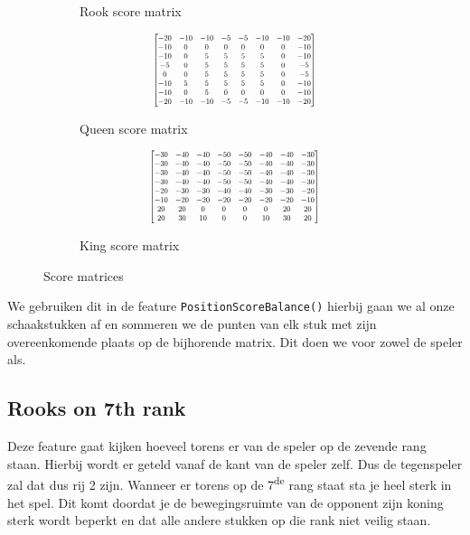 \documentclass[a4paper,openany]{uantwerpenassignment}
\newcommand{\codeword}[1]{
    \colorbox{code}{\texttt{\textcolor{codetext}{#1}}}
}
\newcommand{\ts}{\textsuperscript}
\newcommand\scalemath[2]{\scalebox{#1}{\mbox{\ensuremath{\displaystyle #2}}}}
\begin{document}
\begin{figure}[h]
\begin{subfigure}{.3\textwidth}
$$		$$
		\caption{Rook score matrix}
    \end{subfigure}
    \begin{subfigure}{.3\textwidth}
    	$$
    	\scalemath{0.6}{
    	\begin{bmatrix}
		-20& -10& -10& -5& -5& -10& -10& -20\\
		-10& 0& 0& 0& 0& 0& 0& -10\\
		-10& 0& 5& 5& 5& 5& 0& -10\\
		-5& 0& 5& 5& 5& 5& 0& -5\\
		0& 0& 5& 5& 5& 5& 0& -5\\
		-10& 5& 5& 5& 5& 5& 0& -10\\
		-10& 0& 5& 0& 0& 0& 0& -10\\
		-20& -10& -10& -5& -5& -10& -10& -20
		\end{bmatrix}}
		$$
		\caption{Queen score matrix}
    \end{subfigure}
    \begin{subfigure}{.3\textwidth}
    	$$
    	\scalemath{0.6}{
    	\begin{bmatrix}
		-30& -40& -40& -50& -50& -40& -40& -30\\
		-30& -40& -40& -50& -50& -40& -40& -30\\
		-30& -40& -40& -50& -50& -40& -40& -30\\
		-30& -40& -40& -50& -50& -40& -40& -30\\
		-20& -30& -30& -40& -40& -30& -30& -20\\
		-10& -20& -20& -20& -20& -20& -20& -10\\
		20& 20& 0& 0& 0& 0& 20& 20\\
		20& 30& 10& 0& 0& 10& 30& 20
		\end{bmatrix}}
		$$
		\caption{King score matrix}
    \end{subfigure}
    \caption{Score matrices}
\end{figure}

We gebruiken dit in de feature \codeword{PositionScoreBalance()} hierbij gaan we al onze schaakstukken af en sommeren we de punten van elk stuk met zijn overeenkomende plaats op de bijhorende matrix. Dit doen we voor zowel de speler als.



\subsection{Rooks on 7th rank}
Deze feature gaat kijken hoeveel torens er van de speler op de zevende rang staan. Hierbij wordt er geteld vanaf de kant van de speler zelf. Dus de tegenspeler zal dat dus rij 2 zijn. Wanneer er torens op de 7\ts{de} rang staat sta je heel sterk in het spel. Dit komt doordat je de bewegingsruimte van de opponent zijn koning sterk wordt beperkt en dat alle andere stukken op die rank niet veilig staan.
\end{document}
